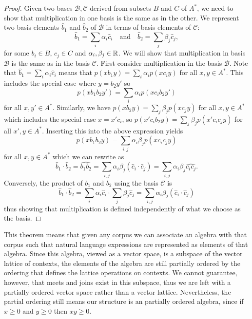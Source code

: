 \documentclass[12pt]{report}
\begin{document}
\begin{proof}
Given two bases $\mathcal{B , C}$ derived from subsets $B$ and $C$ of $A^*$, we need to show that multiplication in one basis is the same as in the other. We represent two basis elements $\hat{b}_1$ and $\hat{b}_2$ of $\mathcal{B}$ in terms of basis elements of $\mathcal{C}$:
$$\hat{b}_1 = \sum_i \alpha_i \hat{c}_i \quad\text{and}\quad
\hat{b}_2 = \sum_j \beta_j \hat{c}_j,$$
for some $b_i \in B$, $c_j \in C$ and $\alpha_i, \beta_j  \in \mathbb{R}$.
We will show that multiplication in basis $\mathcal{B}$ is the same as in the basis $\mathcal{C}$. First consider multiplication in the basis $\mathcal{B}$. Note that $\hat{b}_1 = \sum_i \alpha_i \hat{c}_i$ means that $p(xb_1y) = \sum_i \alpha_i p(xc_iy)$ for all $x,y \in A^*$. This includes the special case where $y = b_2y'$ so $$p(xb_1b_2y') = \sum_i \alpha_i p(xc_ib_2y')$$ for all $x, y' \in A^*$.
Similarly, we have $p(xb_2y) = \sum_j \beta_j p(xc_jy)$ for all $x,y \in A^*$ which includes the special case $x = x'c_i$, so $p(x'c_ib_2y) = \sum_j \beta_j p(x'c_ic_jy)$ for all $x',y \in A^*$. Inserting this into the above expression yields
$$p(xb_1b_2y) = \sum_{i,j} \alpha_i\beta_j p(xc_ic_jy)$$
for all $x,y \in A^*$ which we can rewrite as
$$\hat{b}_1\cdot\hat{b}_2 = \widehat{b_1b_2} = \sum_{i,j}\alpha_i\beta_j (\hat{c}_i\cdot\hat{c}_j)
= \sum_{i,j}\alpha_i\beta_j \widehat{c_ic_j}.$$
Conversely, the product of $b_1$ and $b_2$ using the basis $\mathcal{C}$ is
$$\hat{b}_1\cdot \hat{b}_2 = \sum_i \alpha_i \hat{c}_i \cdot \sum_j \beta_j \hat{c}_j =  \sum_{i,j}\alpha_i\beta_j (\hat{c}_i\cdot\hat{c}_j)$$
thus showing that multiplication is defined independently of what we choose as the basis.
\end{proof}

This theorem means that given any corpus we can associate an algebra with that corpus such that natural language expressions are represented as elements of that algebra. %
Since this algebra, viewed as a vector space, is a subspace of the vector lattice of contexts, the elements of the algebra are still partially ordered by the ordering that defines the lattice operations on contexts. We cannot guarantee, however, that meets and joins exist in this subspace, thus we are left with a partially ordered vector space rather than a vector lattice. Nevertheless, the partial ordering still means our structure is an partially ordered algebra, since if $x \ge 0$ and $y \ge 0$ then $xy \ge 0$.
\end{document}
